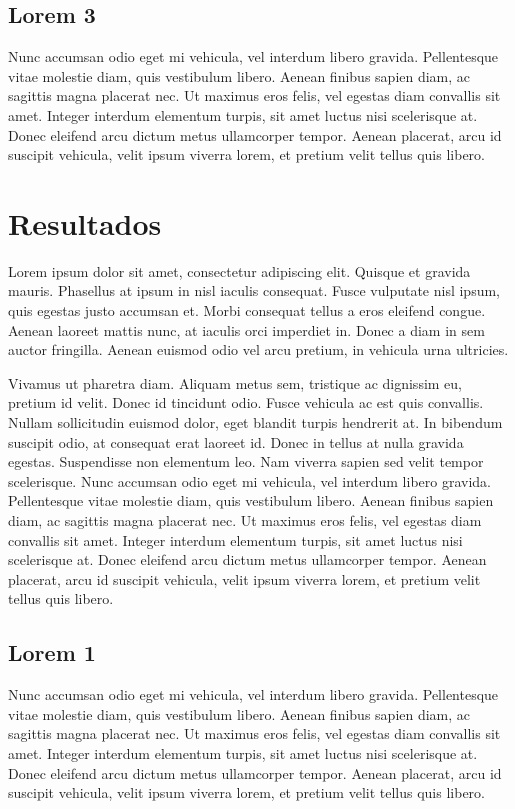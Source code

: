 \documentclass[a4paper, 12pt, openright, oneside]{article}
\begin{document}
\subsection{Lorem 3}
Nunc accumsan odio eget mi vehicula, vel interdum libero gravida. Pellentesque vitae molestie diam, quis vestibulum libero. Aenean finibus sapien diam, ac sagittis magna placerat nec. Ut maximus eros felis, vel egestas diam convallis sit amet. Integer interdum elementum turpis, sit amet luctus nisi scelerisque at. Donec eleifend arcu dictum metus ullamcorper tempor. Aenean placerat, arcu id suscipit vehicula, velit ipsum viverra lorem, et pretium velit tellus quis libero.

\newpage

\section{Resultados}

Lorem ipsum dolor sit amet, consectetur adipiscing elit. Quisque et gravida mauris. Phasellus at ipsum in nisl iaculis consequat. Fusce vulputate nisl ipsum, quis egestas justo accumsan et. Morbi consequat tellus a eros eleifend congue. Aenean laoreet mattis nunc, at iaculis orci imperdiet in. Donec a diam in sem auctor fringilla. Aenean euismod odio vel arcu pretium, in vehicula urna ultricies.

Vivamus ut pharetra diam. Aliquam metus sem, tristique ac dignissim eu, pretium id velit. Donec id tincidunt odio. Fusce vehicula ac est quis convallis. Nullam sollicitudin euismod dolor, eget blandit turpis hendrerit at. In bibendum suscipit odio, at consequat erat laoreet id. Donec in tellus at nulla gravida egestas. Suspendisse non elementum leo. Nam viverra sapien sed velit tempor scelerisque. Nunc accumsan odio eget mi vehicula, vel interdum libero gravida. Pellentesque vitae molestie diam, quis vestibulum libero. Aenean finibus sapien diam, ac sagittis magna placerat nec. Ut maximus eros felis, vel egestas diam convallis sit amet. Integer interdum elementum turpis, sit amet luctus nisi scelerisque at. Donec eleifend arcu dictum metus ullamcorper tempor. Aenean placerat, arcu id suscipit vehicula, velit ipsum viverra lorem, et pretium velit tellus quis libero.

\subsection{Lorem 1}
Nunc accumsan odio eget mi vehicula, vel interdum libero gravida. Pellentesque vitae molestie diam, quis vestibulum libero. Aenean finibus sapien diam, ac sagittis magna placerat nec. Ut maximus eros felis, vel egestas diam convallis sit amet. Integer interdum elementum turpis, sit amet luctus nisi scelerisque at. Donec eleifend arcu dictum metus ullamcorper tempor. Aenean placerat, arcu id suscipit vehicula, velit ipsum viverra lorem, et pretium velit tellus quis libero.
\end{document}
